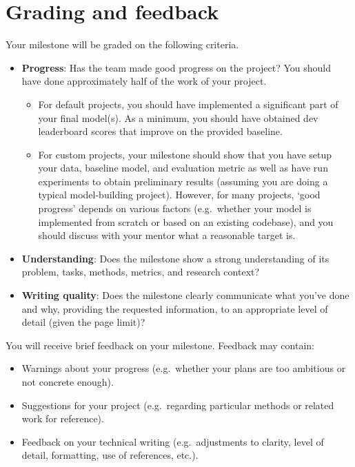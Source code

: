 \documentclass[11pt,a4paper]{article}
\begin{document}
\section{Grading and feedback}

Your milestone will be graded on the following criteria.

\begin{itemize}[nosep]
    \item \textbf{Progress}: Has the team made good progress on the project? You should have done approximately half of the work of your project.
    \begin{itemize}[nosep]
        \item For default projects, you should have implemented a significant part of your final model(s). As a minimum, you should have obtained dev leaderboard scores that improve on the provided baseline.
        \item For custom projects, your milestone should show that you have setup your data, baseline model, and evaluation metric as well as have run experiments to obtain preliminary results (assuming you are doing a typical model-building project). However, for many projects, `good progress' depends on various factors (e.g.\ whether your model is implemented from scratch or based on an existing codebase), and you should discuss with your mentor what a reasonable target is.
    \end{itemize}
    \item \textbf{Understanding}: Does the milestone show a strong understanding of its problem, tasks, methods, metrics, and research context?
    \item \textbf{Writing quality}: Does the milestone clearly communicate what you've done and why, providing the requested information, to an appropriate level of detail (given the page limit)?
\end{itemize}

You will receive brief feedback on your milestone. Feedback may contain:

\begin{itemize}[nosep]
    \item Warnings about your progress (e.g.\ whether your plans are too ambitious or not concrete enough).
    \item Suggestions for your project (e.g.\ regarding particular methods or related work for reference).
    \item Feedback on your technical writing (e.g.\ adjustments to clarity, level of detail, formatting, use of references, etc.).
\end{itemize}
\end{document}
